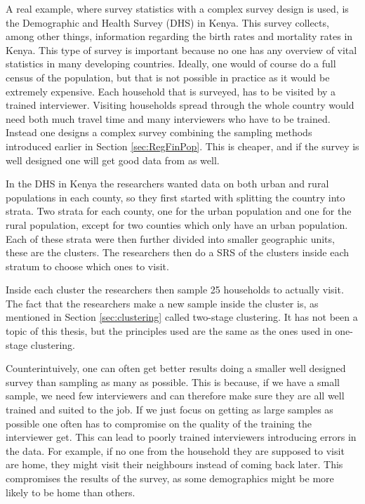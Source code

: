 \documentclass{article}
\begin{document}
A real example, where survey statistics with a complex survey design is used, is the Demographic and Health
Survey (DHS) in Kenya. This survey collects, among other things, 
information regarding the birth rates and mortality rates in Kenya. This type of
survey is important because no one has any overview of vital statistics in
many developing countries.
Ideally, one would of course do a full census of the population, but that is not
possible in practice as it would be extremely expensive. Each household that is
surveyed, has to be visited by a trained interviewer. Visiting
households spread through the whole country would need both much travel time and
many interviewers who have to be trained. Instead one designs a
complex survey combining the sampling methods introduced earlier in Section
\ref{sec:RegFinPop}. This is cheaper, and if the survey is well designed
one will get good data from as well.

In the DHS in Kenya the researchers wanted data on both urban and rural
populations in each county, so they first started with splitting the country into
strata. Two strata for each county, one for the urban population and one for the
rural population, except for two counties which only have an urban population.
Each of these strata were then further divided into smaller geographic units,
these are the clusters. The researchers then do a SRS of the clusters inside
each stratum to choose which ones to visit. \cite{DHS}

Inside each cluster the researchers then sample 25 households to actually
visit. The fact that the researchers make a new sample inside the cluster is, as
mentioned in Section \ref{sec:clustering}
called two-stage clustering. It has not been a topic of this thesis, but the
principles used are the same as the ones used in one-stage clustering. \cite{DHS}

Counterintuively, one can often get better results doing a smaller well designed
survey than sampling as many as possible. This is because, if we have a small
sample, we need few interviewers and can therefore make sure
they are all well trained and suited to the job. If we just focus on getting as
large samples as possible one often has to compromise on the quality of the
training the interviewer get. This can lead to poorly trained interviewers introducing errors
in the data. For example, if no one from the household they are supposed to visit are
home, they might visit their neighbours instead of coming back later. This compromises the results of
the survey, as some demographics might be more likely to be home than others.
\end{document}
